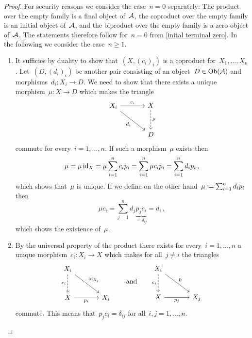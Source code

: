 \begin{proof}
  For security reasons we consider the case~$n = 0$ separately:
  The product over the empty family is a final object of~$\mathcal{A}$, the coproduct over the empty family is an initial object of~$\mathcal{A}$, and the biproduct over the empty family is a zero object of~$\mathcal{A}$.
  The statements therefore follow for~$n = 0$ from \cref{inital terminal zero}.
  In the following we consider the case~$n \geq 1$.
  \begin{enumerate}
    \item
      It sufficies by duality to show that~$(X, (c_i)_i)$ is a coproduct for~$X_1, \dotsc, X_n$.
      Let~$(D, (d_i)_i)$ be another pair consisting of an object~$D \in \operatorname{Ob}(\mathcal{A})$ and morphisms~$d_i \colon X_i \to D$.
      We need to show that there exists a unique morphism~$\mu \colon X \to D$ which makes the triangle
      \[
        \begin{tikzcd}[sep = large]
            X_i
            \arrow{r}[above]{c_i}
            \arrow{dr}[below left]{d_i}
          & X
            \arrow[dashed]{d}[right]{\mu}
          \\
            {}
          & D
        \end{tikzcd}
      \]
      commute for every~$i = 1, \dotsc, n$. 
      If such a morphism~$\mu$ exists then
      \[
          \mu
        = \mu \operatorname{id}_X
        = \mu \sum_{i=1}^n c_i p_i
        = \sum_{i=1}^n \mu c_i p_i
        = \sum_{i=1}^n d_i p_i \,,
      \]
      which shows that~$\mu$ is unique.
      If we define on the other hand~$\mu \coloneqq \sum_{i=1}^n d_i p_i$ then
      \[
          \mu c_i
        = \sum_{j=1}^n d_j \underbrace{p_j c_i}_{= \delta_{ij}}
        = d_i \,,
      \]
      which shows the existence of~$\mu$.
    \item
      By the universal property of the product there exists for every~$i = 1, \dotsc, n$ a unique morphism~$c_i \colon X_i \to X$ which makes for all~$j \neq i$ the triangles
      \[
        \begin{tikzcd}[sep = large]
            X_i
            \arrow{dr}[above right]{\id_{X_i}}
            \arrow[dashed]{d}[left]{c_i}
          & {}
          \\
            X
            \arrow{r}[below]{p_i}
          & X_i
        \end{tikzcd}
        \qquad\text{and}\qquad
        \begin{tikzcd}[sep = large]
            X_i
            \arrow{dr}[above right]{0}
            \arrow[dashed]{d}[left]{c_i}
          & {}
          \\
            X
            \arrow{r}[below]{p_j}
          & X_j
        \end{tikzcd}
      \]
      commute.
      This means that~$p_j c_i = \delta_{ij}$ for all~$i, j = 1, \dotsc, n$.
      

\end{enumerate}
\end{proof}
